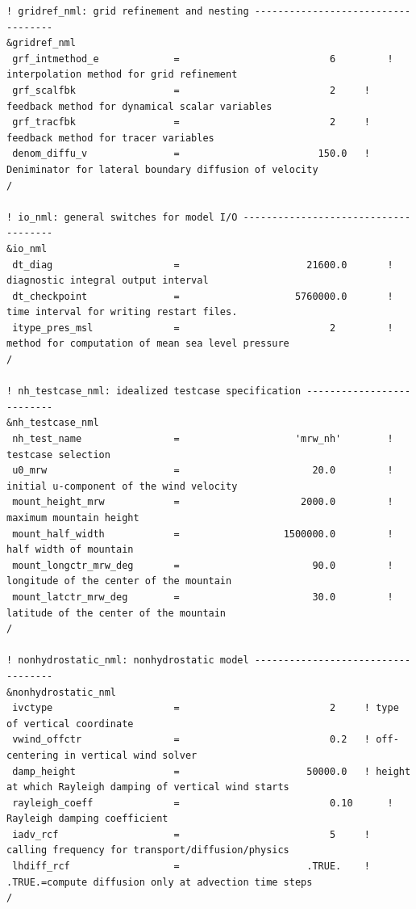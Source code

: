 \begin{landscape}
\begin{Verbatim}[frame=single]
! gridref_nml: grid refinement and nesting -----------------------------------
&gridref_nml
 grf_intmethod_e             =                          6         ! interpolation method for grid refinement
 grf_scalfbk                 =                          2	  ! feedback method for dynamical scalar variables
 grf_tracfbk                 =                          2	  ! feedback method for tracer variables
 denom_diffu_v               =                        150.0	  ! Deniminator for lateral boundary diffusion of velocity
/

! io_nml: general switches for model I/O -------------------------------------
&io_nml
 dt_diag                     =                      21600.0       ! diagnostic integral output interval
 dt_checkpoint               =                    5760000.0       ! time interval for writing restart files.
 itype_pres_msl              =                          2         ! method for computation of mean sea level pressure
/

! nh_testcase_nml: idealized testcase specification --------------------------
&nh_testcase_nml
 nh_test_name                =                    'mrw_nh'        ! testcase selection
 u0_mrw                      =                       20.0         ! initial u-component of the wind velocity
 mount_height_mrw            =                     2000.0         ! maximum mountain height 
 mount_half_width            =                  1500000.0	      ! half width of mountain
 mount_longctr_mrw_deg       =                       90.0         ! longitude of the center of the mountain
 mount_latctr_mrw_deg        =                       30.0         ! latitude of the center of the mountain
/

! nonhydrostatic_nml: nonhydrostatic model -----------------------------------
&nonhydrostatic_nml
 ivctype                     =                          2	  ! type of vertical coordinate
 vwind_offctr                =                          0.2	  ! off-centering in vertical wind solver
 damp_height                 =                      50000.0	  ! height at which Rayleigh damping of vertical wind starts
 rayleigh_coeff              =                          0.10	  ! Rayleigh damping coefficient
 iadv_rcf                    =                          5	  ! calling frequency for transport/diffusion/physics
 lhdiff_rcf                  =                      .TRUE.	  ! .TRUE.=compute diffusion only at advection time steps
/


\end{Verbatim}
\end{landscape}
